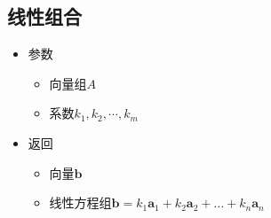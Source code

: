 \documentclass[UTF8,a4paper,12pt,scheme=chinese]{ctexbook}
\begin{document}
	\subsection{线性组合}
	\begin{itemize}
		\item 参数
		\begin{itemize}
			\item 向量组$A$
			\item 系数$k_1,k_2,\dotsb,k_m$
		\end{itemize}
		\item 返回
		\begin{itemize}
			\item 向量$\boldsymbol{b}$
			\item 线性方程组$\boldsymbol{b}=k_1\boldsymbol{a}_1+k_2\boldsymbol{a}_2+\dots+k_n\boldsymbol{a}_n$
		\end{itemize}
	\end{itemize}
\end{document}
